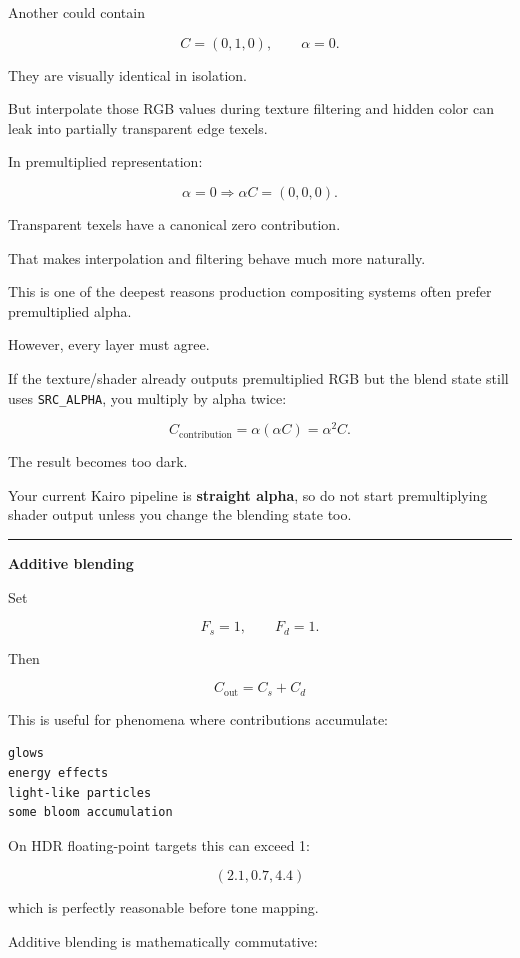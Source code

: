 Another could contain

\[
C=(0,1,0),\qquad \alpha=0.
\]

They are visually identical in isolation.

But interpolate those RGB values during texture filtering and hidden color can leak into partially transparent edge texels.

In premultiplied representation:

\[
\alpha=0
\Rightarrow
\alpha C=(0,0,0).
\]

Transparent texels have a canonical zero contribution.

That makes interpolation and filtering behave much more naturally.

This is one of the deepest reasons production compositing systems often prefer premultiplied alpha.

However, every layer must agree.

If the texture/shader already outputs premultiplied RGB but the blend state still uses \texttt{SRC\_ALPHA}, you multiply by alpha twice:

\[
C_{\text{contribution}}
=
\alpha(\alpha C)
=
\alpha^2C.
\]

The result becomes too dark.

Your current Kairo pipeline is \textbf{straight alpha}, so do not start premultiplying shader output unless you change the blending state too.

\begin{center}\rule{0.5\linewidth}{0.5pt}\end{center}

\textbf{Additive blending}

Set

\[
F_s=1,\qquad F_d=1.
\]

Then

\[
\boxed{
C_{\text{out}}=C_s+C_d
}
\]

This is useful for phenomena where contributions accumulate:

\begin{verbatim}
glows
energy effects
light-like particles
some bloom accumulation
\end{verbatim}

On HDR floating-point targets this can exceed 1:

\[
(2.1,0.7,4.4)
\]

which is perfectly reasonable before tone mapping.

Additive blending is mathematically commutative:

